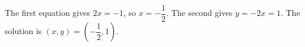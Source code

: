 The first equation gives $2x=-1$, so $x=-\dfrac12$. The second gives $y=-2x=1$. The solution is $\boxed{\left(x,y\right)=\left(-\dfrac12,1\right)}$.
